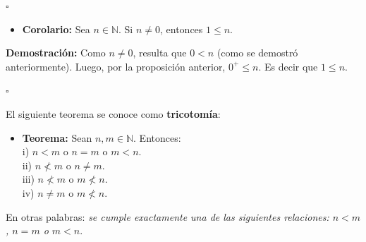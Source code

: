 \documentclass[10 pt]{article}
\begin{document}
\begin{flushright}
    $\square$
\end{flushright}

\begin{itemize}
    \item \Large{\textbf{Corolario:} Sea $n \in \mathbb N$. Si $n \neq 0$, entonces $1 \leq n$.} \\
\end{itemize}

\Large{\textbf{Demostración:} Como $n \neq 0$, resulta que $0<n$ (como se demostró anteriormente). Luego, por la proposición anterior, $0^+ \leq n$. Es decir que $1 \leq n$.} \\

\begin{flushright}
    $\square$
\end{flushright}

\Large{El siguiente teorema se conoce como \textbf{tricotomía}:} \\

\begin{itemize}
    \item \Large{\textbf{Teorema:} Sean $n,m \in \mathbb N$. Entonces: \\

    i) $n<m$ o $n=m$ o $m<n$. \\

    ii) $n \nless m$ o $n \neq m$. \\

    iii) $n \nless m$ o $m \nless n$. \\

    iv) $n \neq m$ o $m \nless n$.} \\
\end{itemize}

\Large{En otras palabras: \textit{se cumple exactamente una de las siguientes relaciones: $n<m$, $n=m$ o $m<n$}.} \\
\end{document}
